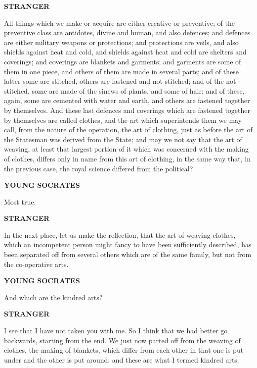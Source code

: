 \documentclass[11pt,letter]{article}
\begin{document}
\par \textbf{STRANGER}
\par   All things which we make or acquire are either creative or preventive; of the preventive class are antidotes, divine and human, and also defences; and defences are either military weapons or protections; and protections are veils, and also shields against heat and cold, and shields against heat and cold are shelters and coverings; and coverings are blankets and garments; and garments are some of them in one piece, and others of them are made in several parts; and of these latter some are stitched, others are fastened and not stitched; and of the not stitched, some are made of the sinews of plants, and some of hair; and of these, again, some are cemented with water and earth, and others are fastened together by themselves. And these last defences and coverings which are fastened together by themselves are called clothes, and the art which superintends them we may call, from the nature of the operation, the art of clothing, just as before the art of the Statesman was derived from the State; and may we not say that the art of weaving, at least that largest portion of it which was concerned with the making of clothes, differs only in name from this art of clothing, in the same way that, in the previous case, the royal science differed from the political?

\par \textbf{YOUNG SOCRATES}
\par   Most true.

\par \textbf{STRANGER}
\par   In the next place, let us make the reflection, that the art of weaving clothes, which an incompetent person might fancy to have been sufficiently described, has been separated off from several others which are of the same family, but not from the co-operative arts.

\par \textbf{YOUNG SOCRATES}
\par   And which are the kindred arts?

\par \textbf{STRANGER}
\par   I see that I have not taken you with me. So I think that we had better go backwards, starting from the end. We just now parted off from the weaving of clothes, the making of blankets, which differ from each other in that one is put under and the other is put around:  and these are what I termed kindred arts.
\end{document}
